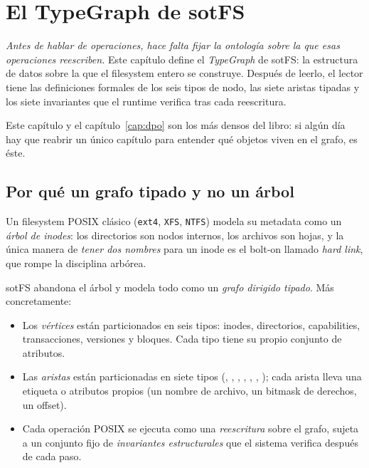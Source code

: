 \chapter{El TypeGraph de sotFS}
\label{cap:typegraph}

\emph{Antes de hablar de operaciones, hace falta fijar la ontología sobre la
que esas operaciones reescriben.} Este capítulo define el \emph{TypeGraph}
de sotFS: la estructura de datos sobre la que el filesystem entero se
construye. Después de leerlo, el lector tiene las definiciones formales de
los seis tipos de nodo, las siete aristas tipadas y los siete invariantes
que el runtime verifica tras cada reescritura.

Este capítulo y el capítulo~\ref{cap:dpo} son los más densos del libro: si
algún día hay que reabrir un único capítulo para entender qué objetos viven
en el grafo, es éste.

\section{Por qué un grafo tipado y no un árbol}

Un filesystem POSIX clásico (\texttt{ext4}, \texttt{XFS}, \texttt{NTFS})
modela su metadata como un \emph{árbol de inodes}: los directorios son
nodos internos, los archivos son hojas, y la única manera de \emph{tener
dos nombres} para un inode es el bolt-on llamado \emph{hard link}, que
rompe la disciplina arbórea.

sotFS abandona el árbol y modela todo como un \emph{grafo dirigido tipado}.
Más concretamente:

\begin{itemize}
  \item Los \emph{vértices} están particionados en seis tipos: inodes,
    directorios, capabilities, transacciones, versiones y bloques. Cada
    tipo tiene su propio conjunto de atributos.
  \item Las \emph{aristas} están particionadas en siete tipos
    (\econtains, \egrants, \edelegates, \ederivedfrom, \esupersedes,
    \epointsto, \ehasxattr); cada arista lleva una etiqueta o atributos
    propios (un nombre de archivo, un bitmask de derechos, un offset).
  \item Cada operación POSIX se ejecuta como una \emph{reescritura} sobre
    el grafo, sujeta a un conjunto fijo de \emph{invariantes
    estructurales} que el sistema verifica después de cada paso.
\end{itemize}

